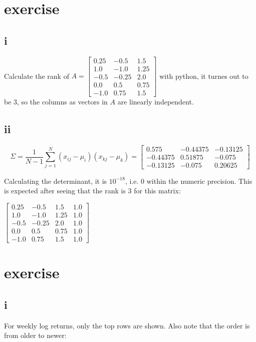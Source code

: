 \documentclass{article}
\begin{document}
\section{exercise}
\subsection*{i}
Calculate the rank of
$A = \displaystyle \left[\begin{matrix}0.25 & -0.5 & 1.5\\1.0 & -1.0 & 1.25\\-0.5 & -0.25 & 2.0\\0.0 & 0.5 & 0.75\\-1.0 & 0.75 & 1.5\end{matrix}\right]$
with python, it turnes out to be 3, so the columns as vectors in $A$ are linearly independent.
\subsection*{ii}
\[
    \Sigma = \frac{1}{N-1} \sum_{j=1}^N (x_{ij} - \mu_i)(x_{kj} - \mu_k)
    =\displaystyle \left[\begin{matrix}0.575 & -0.44375 & -0.13125\\-0.44375 & 0.51875 & -0.075\\-0.13125 & -0.075 & 0.20625\end{matrix}\right]
\]

Calculating the determinant, it is $10^{-18}$, i.e. 0 within the numeric precision.
This is expected after seeing that the rank is 3 for this matrix:

$\displaystyle \left[\begin{matrix}0.25 & -0.5 & 1.5 & 1.0\\1.0 & -1.0 & 1.25 & 1.0\\-0.5 & -0.25 & 2.0 & 1.0\\0.0 & 0.5 & 0.75 & 1.0\\-1.0 & 0.75 & 1.5 & 1.0\end{matrix}\right]$
\section{exercise}
\subsection*{i}
For weekly log returns, only the top rows are shown.
Also note that the order is from older to newer:
\end{document}
